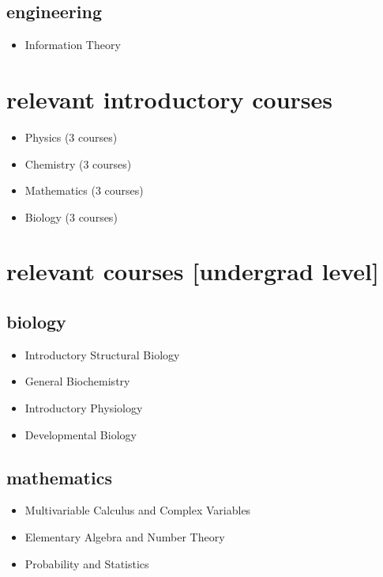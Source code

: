 \documentclass[11pt]{friggeri-cv}%
\begin{document}
\begin{multicols}{2}[]
\begin{minipage}{1.1\columnwidth}
\subsection{engineering}
\begin{itemize}
\item Information Theory
\end{itemize}
\vspace{1em}
\section{ relevant introductory courses }
\begin{itemize}
\item Physics (3 courses)
\item Chemistry (3 courses)
\item Mathematics (3 courses)
\item Biology (3 courses)
\end{itemize}



\end{minipage}

\hspace{-1em}
\begin{minipage}{1.05\columnwidth}



\section{relevant courses [undergrad level]}

\subsection{biology}
\begin{itemize}

\item Introductory Structural Biology
\item General Biochemistry
\item Introductory Physiology
\item Developmental Biology
\end{itemize}


\subsection{mathematics}
\begin{itemize}
\item Multivariable Calculus and Complex Variables
\item Elementary Algebra and Number Theory
\item Probability and Statistics
\end{itemize}




\end{minipage}
\end{multicols}
\end{document}
